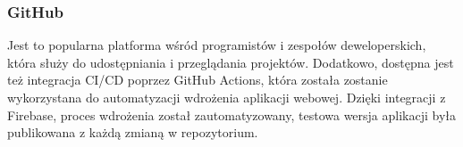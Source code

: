 \subsubsection{GitHub}
\label{subsubsec:github}

Jest to popularna platforma wśród programistów i zespołów deweloperskich, która służy do udostępniania i przeglądania projektów. Dodatkowo, dostępna jest też integracja CI/CD poprzez GitHub Actions, która została zostanie wykorzystana do automatyzacji wdrożenia aplikacji webowej. Dzięki integracji z Firebase, proces wdrożenia został zautomatyzowany, testowa wersja aplikacji była publikowana z każdą zmianą w repozytorium.
